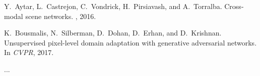 \documentclass[10pt,letterpaper]{article}
\begin{document}
 
 



\begin{thebibliography}{10}\itemsep=-1pt

Y.~Aytar, L.~Castrejon, C.~Vondrick, H.~Pirsiavash, and A.~Torralba.
\newblock Cross-modal scene networks.
, 2016.

K.~Bousmalis, N.~Silberman, D.~Dohan, D.~Erhan, and D.~Krishnan.
\newblock Unsupervised pixel-level domain adaptation with generative
  adversarial networks.
\newblock In {\em CVPR}, 2017.


...

\end{thebibliography}
\end{document}
